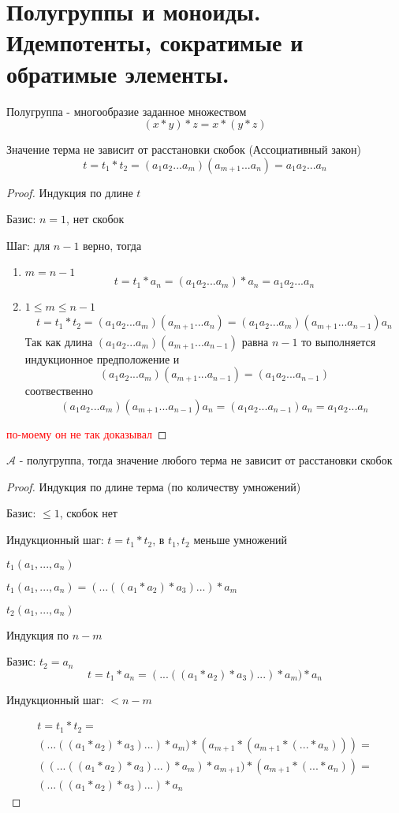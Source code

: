 \documentclass[../main/document.tex]{subfiles}
\begin{document}
\section{Полугруппы и моноиды. Идемпотенты, сократимые и обратимые элементы.}
\begin{dfn}[Полугруппа]
Полугруппа - многообразие заданное множеством
$$(x*y)*z=x*(y*z)$$
\end{dfn}
\begin{exm}
\end{exm}
\begin{thm}
Значение терма не зависит от расстановки скобок (Ассоциативный закон)
$$t=t_1*t_2=(a_{1}a_{2}...a_{m})(a_{m+1}...a_n)=a_{1}a_{2}...a_{n}$$
\begin{proof}
Индукция по длине $t$

Базис: $n=1$, нет скобок

Шаг: для $n-1$ верно, тогда
\begin{enumerate}
\item $m=n-1$
$$t=t_1*a_n=(a_{1}a_{2}...a_{m})*a_n=a_{1}a_{2}...a_{n}$$
\item $1\leq m\leq n-1$
\begin{multline*}
t=t_1*t_2=(a_{1}a_{2}...a_{m})(a_{m+1}...a_n)=(a_{1}a_{2}...a_{m})(a_{m+1}...a_{n-1})a_n
\end{multline*}
Так как длина $(a_{1}a_{2}...a_{m})(a_{m+1}...a_{n-1})$ равна $n-1$ то выполняется индукционное предположение и
$$(a_{1}a_{2}...a_{m})(a_{m+1}...a_{n-1})=(a_{1}a_{2}...a_{n-1})$$
соотвественно
$$(a_{1}a_{2}...a_{m})(a_{m+1}...a_{n-1})a_n=
(a_{1}a_{2}...a_{n-1})a_n=a_{1}a_{2}...a_{n}$$
\end{enumerate}
\textcolor{red}{по-моему он не так доказывал}
\end{proof}
\end{thm}
\begin{thm}
$\mathcal{A}$ - полугруппа, тогда значение любого терма не зависит от расстановки скобок
\begin{proof}
Индукция по длине терма (по количеству умножений)

Базис: $\leq 1$, скобок нет

Индукционный шаг: $t=t_1*t_2$, в $t_1,t_2$ меньше умножений

$t_1(a_1,...,a_n)$

$t_1(a_1,...,a_n)=(...((a_1*a_2)*a_3)...)*a_m$

$t_2(a_1,...,a_n)$

Индукция по $n-m$

Базис: $t_2=a_n$
$$t=t_1*a_n=(...((a_1*a_2)*a_3)...)*a_m)*a_n$$

Индукционный шаг: $<n-m$

\begin{multline*}
t=t_1*t_2=\\(...((a_1*a_2)*a_3)...)*a_m)*(a_{m+1}*(a_{m+1}*(...*a_n)))=\\
((...((a_1*a_2)*a_3)...)*a_m)*a_{m+1})*(a_{m+1}*(...*a_n))=\\
(...((a_1*a_2)*a_3)...)*a_n
\end{multline*}
\end{proof}
\end{thm}
\end{document}
